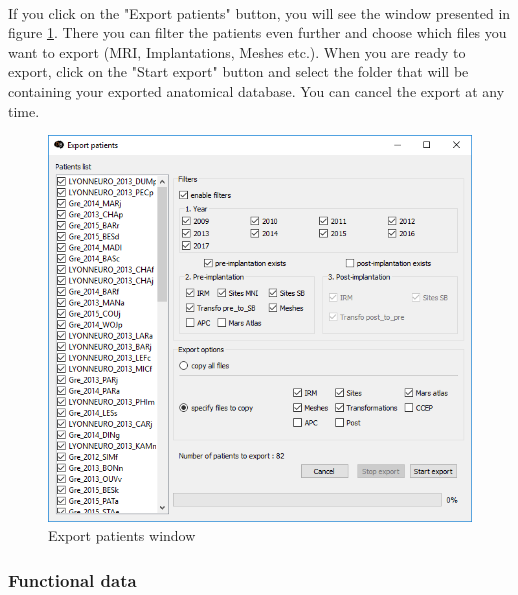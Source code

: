 \documentclass[a4paper]{article}
\begin{document}
\paragraph{} If you click on the "Export patients" button, you will see the window presented in figure \ref{dbManagerExportPatient}. There you can filter the patients even further and choose which files you want to export (MRI, Implantations, Meshes etc.). When you are ready to export, click on the "Start export" button and select the folder that will be containing your exported anatomical database. You can cancel the export at any time.
\begin{figure}[H]
\begin{center}
\includegraphics[scale=0.5]{ExportPatient.png}
\end{center}
\caption{\label{dbManagerExportPatient}Export patients window}
\end{figure}
\subsubsection{Functional data}\label{exportFunctional}
\end{document}
